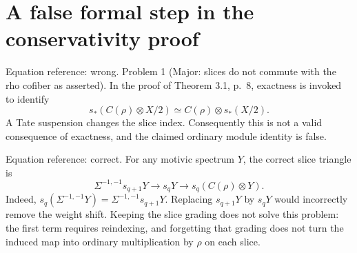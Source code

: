 \documentclass[10pt]{article}
\begin{document}
\section*{A false formal step in the conservativity proof}
Equation reference: wrong. Problem 1 (Major: slices do not commute with the rho cofiber as asserted).  In the proof of Theorem 3.1, p. 8, exactness is invoked to identify \[
 s_*(C(\rho)\otimes X/2)\simeq C(\rho)\otimes s_*(X/2).\] A Tate suspension changes the slice index. Consequently this is not a valid consequence of exactness, and the claimed ordinary module identity is false.\par
Equation reference: correct. For any motivic spectrum \(Y\), the correct slice triangle is \[
 \Sigma^{-1,-1}s_{q+1}Y\longrightarrow s_qY
       \longrightarrow s_q(C(\rho)\otimes Y).\] Indeed, \(s_q(\Sigma^{-1,-1}Y)
=\Sigma^{-1,-1}s_{q+1}Y\). Replacing \(s_{q+1}Y\) by \(s_qY\) would incorrectly remove the weight shift. Keeping the slice grading does not solve this problem: the first term requires reindexing, and forgetting that grading does not turn the induced map into ordinary multiplication by \(\rho\) on each slice.\par
\end{document}
